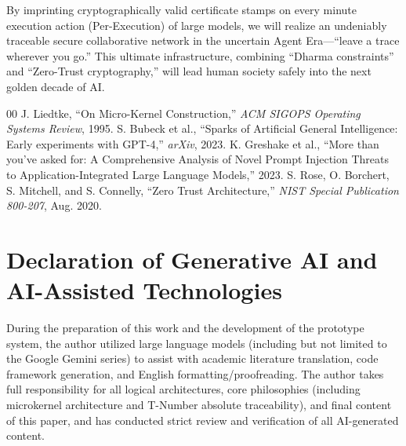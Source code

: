 \documentclass[conference]{IEEEtran}
\begin{document}
By imprinting cryptographically valid certificate stamps on every minute execution action (Per-Execution) of large models, we will realize an undeniably traceable secure collaborative network in the uncertain Agent Era—``leave a trace wherever you go.'' This ultimate infrastructure, combining ``Dharma constraints'' and ``Zero-Trust cryptography,'' will lead human society safely into the next golden decade of AI.

\begin{thebibliography}{00}
 J. Liedtke, ``On Micro-Kernel Construction,'' \textit{ACM SIGOPS Operating Systems Review}, 1995.
 S. Bubeck et al., ``Sparks of Artificial General Intelligence: Early experiments with GPT-4,'' \textit{arXiv}, 2023.
 K. Greshake et al., ``More than you've asked for: A Comprehensive Analysis of Novel Prompt Injection Threats to Application-Integrated Large Language Models,'' 2023.
 S. Rose, O. Borchert, S. Mitchell, and S. Connelly, ``Zero Trust Architecture,'' \textit{NIST Special Publication 800-207}, Aug. 2020.
\end{thebibliography}

\section*{Declaration of Generative AI and AI-Assisted Technologies}
During the preparation of this work and the development of the prototype system, the author utilized large language models (including but not limited to the Google Gemini series) to assist with academic literature translation, code framework generation, and English formatting/proofreading. The author takes full responsibility for all logical architectures, core philosophies (including microkernel architecture and T-Number absolute traceability), and final content of this paper, and has conducted strict review and verification of all AI-generated content.
\end{document}
